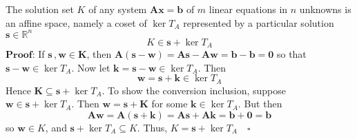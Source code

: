 \documentclass{book}
\begin{document}
\begin{theorem}
The solution set $\mathit{K}$ of any system $\mathbf{A}\mathbf{x}=\mathbf{b}$ of $m$ linear equations in $n$ unknowns is 
an affine space, namely a coset of $\ker{T_{A}}$ represented by a particular solution $\mathbf{s} \in \mathbb{R}^{n}$ \\
\[ \mathit{K} \in \mathbf{s} + \ker{T_{A}}  \]
$\mathbf{Proof}$: If $\mathbf{s} \,, \mathbf{w} \in \mathbf{K}$, then 
$\mathbf{A}(\mathbf{s} - \mathbf{w}) = \mathbf{A}\mathbf{s} - \mathbf{A}\mathbf{w} = \mathbf{b} - \mathbf{b} = \mathbf{0}$
so that $\mathbf{s} - \mathbf{w} \in \ker{T_{A}}$. Now let $\mathbf{k} = \mathbf{s} - \mathbf{w} \in \ker{T_{A}}$. Then
\[ \mathbf{w} = \mathbf{s} + \mathbf{k} \in \ker{T_{A}} \]
Hence $\mathbf{K} \subseteq \mathbf{s} + \ker{T_{A}}$. To show the conversion inclusion, suppose $\mathbf{w} \in \mathbf{s} + \ker{T_{A}}$. Then $\mathbf{w} = \mathbf{s} + \mathbf{K}$ for some $\mathbf{k} \in \ker{T_{A}}$. 
But then 
\[ \mathbf{A}\mathbf{w} = \mathbf{A}(\mathbf{s} + \mathbf{k}) = \mathbf{A}\mathbf{s} + \mathbf{A}\mathbf{k} = \mathbf{b} + \mathbf{0} = \mathbf{b} \]
so $\mathbf{w} \in \mathit{K}$, and $\mathbf{s} + \ker{T_{A}} \subseteq \mathit{K}$. Thus, $\mathit{K} = \mathbf{s} + \ker{T_{A}} \quad \square$

\end{theorem}
\end{document}
